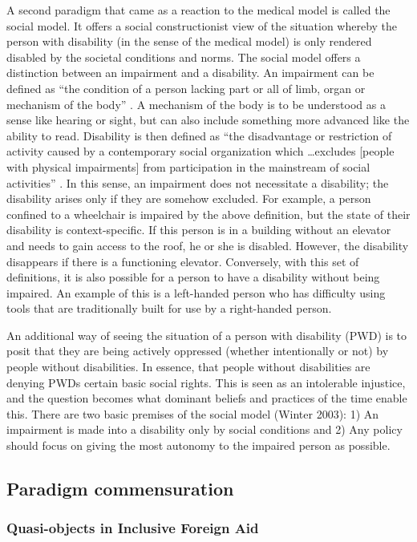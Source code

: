 \documentclass[a4paper]{article}
\begin{document}
A second paradigm that came as a reaction to the medical model is called the
social model. It offers a social constructionist view of the situation whereby
the person with disability (in the sense of the medical model) is only rendered
disabled by the societal conditions and norms. The social model offers a
distinction between an impairment and a disability. An impairment can be
defined as ``the condition of a person lacking part or all of limb, organ or
mechanism of the body'' \citep{winter2003development}. A mechanism of the body
is to be understood as a sense like hearing or sight, but can also include
something more advanced like the ability to read. Disability is then defined as
``the disadvantage or restriction of activity caused by a contemporary social
organization which \ldots excludes [people with physical impairments] from
participation in the mainstream of social activities''
\citep{winter2003development}. In this sense, an impairment does not
necessitate a disability; the disability arises only if they are somehow
excluded. For example, a person confined to a wheelchair is impaired by the
above definition, but the state of their disability is context-specific. If
this person is in a building without an elevator and needs to gain access to
the roof, he or she is disabled. However, the disability disappears if there is
a functioning elevator. Conversely, with this set of definitions, it is also
possible for a person to have a disability without being impaired. An example
of this is a left-handed person who has difficulty using tools that are
traditionally built for use by a right-handed person.

An additional way of seeing the situation of a person with disability (PWD) is
to posit that they are being actively oppressed (whether intentionally or not)
by people without disabilities. In essence, that people without disabilities
are denying PWDs certain basic social rights. This is seen as an intolerable
injustice, and the question becomes what dominant beliefs and practices of the
time enable this. There are two basic premises of the social model (Winter
2003): 1) An impairment is made into a disability only by social conditions
and 2) Any policy should focus on giving the most autonomy to the impaired
person as possible.

\subsection{Paradigm commensuration}

\subsubsection{Quasi-objects in Inclusive Foreign Aid}
\end{document}
